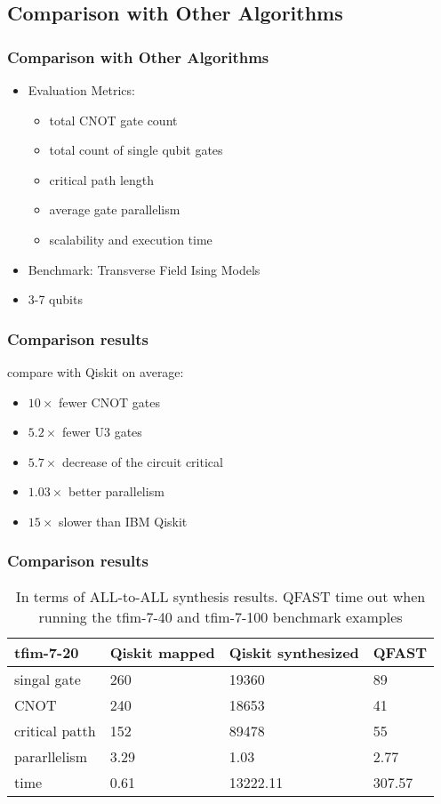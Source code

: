 \documentclass[aspectratio=1610]{beamer}
\begin{document}
\subsection{Comparison with Other Algorithms}
\begin{frame}
\frametitle{Comparison with Other Algorithms}
\begin{itemize}
  \item Evaluation Metrics:
  \begin{itemize}
    \item total CNOT gate count
    \item total count of single qubit gates
    \item critical path length
    \item average gate parallelism
    \item scalability and execution time
  \end{itemize}
  \item Benchmark: Transverse Field Ising Models
  \item 3-7 qubits
\end{itemize}
\end{frame}
\begin{frame}
\frametitle{Comparison results}
compare with Qiskit on average:
\begin{itemize}
  \item $10\times$ fewer CNOT gates
  \item $5.2\times$ fewer U3 gates
  \item $5.7\times$ decrease of the circuit critical
  \item $1.03\times$ better parallelism
  \item $15\times$ slower than IBM Qiskit
\end{itemize}
\end{frame}
\begin{frame}
  \frametitle{Comparison results}

  \begin{table}[]
    \begin{tabular}{l|lll}
    tfim-7-20  & Qiskit mapped & Qiskit synthesized & QFAST  \\\hline
    singal gate    & 260           & 19360              & 89     \\
    CNOT           & 240           & 18653              & 41     \\
    critical patth & 152           & 89478              & 55     \\
    pararllelism   & 3.29          & 1.03               & 2.77   \\
    time           & 0.61          & 13222.11           & 307.57
    \end{tabular}
    \caption{In terms of ALL-to-ALL synthesis results. QFAST time out when running the tfim-7-40 and tfim-7-100 benchmark examples}
    \end{table}
\end{frame}
\end{document}
